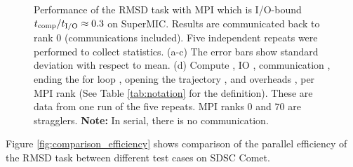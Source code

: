 \begin{figure}[ht!]
\caption{Performance of the RMSD task with MPI which is I/O-bound ${t}_{\text{comp}}/{t}_{\text{I/O}} \approx 0.3$ on SuperMIC.
Results are communicated back to rank 0 (communications included). Five independent repeats were performed to collect statistics. (a-c) The error bars show
standard deviation with respect to mean. (d) Compute \tcomp, IO \tIO, communication \tcomm, ending the for loop ,
  opening the trajectory , and overheads ,  per MPI rank (See Table \ref{tab:notation} for the definition).
These are data from one run of the five repeats. MPI ranks 0 and 70 are stragglers. \textbf{Note:} In serial, there is no communication.}
\label{fig:MPIwithIO-SuperMIC}
\end{figure} 

Figure \ref{fig:comparison_efficiency} shows comparison of the parallel efficiency of the RMSD task between different test cases on SDSC Comet.  

